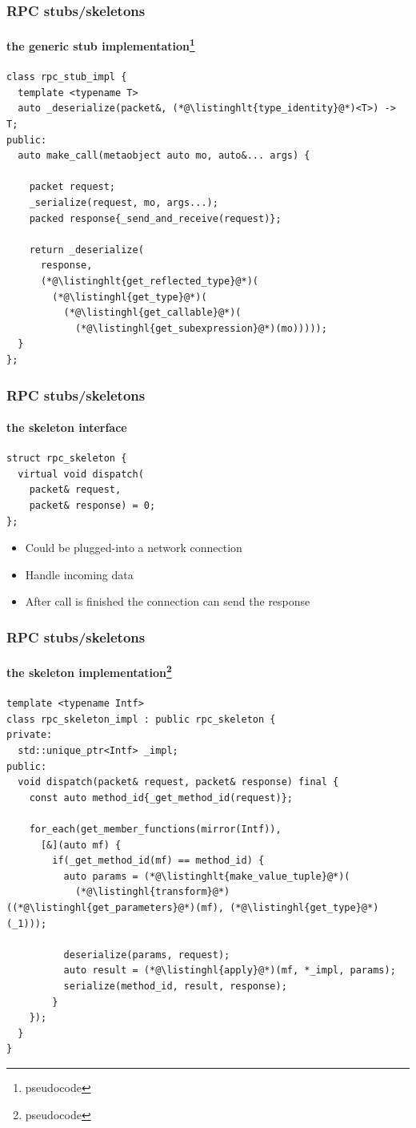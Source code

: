 \documentclass[compress,table,xcolor=table]{beamer}
\begin{document}
\begin{frame}[fragile]
  \frametitle{RPC stubs/skeletons}
  \framesubtitle{the generic stub implementation\footnote{pseudocode}}
  \begin{lstlisting}[language=c++2x,basicstyle=\footnotesize\ttfamily]
class rpc_stub_impl {
  template <typename T>
  auto _deserialize(packet&, (*@\listinghlt{type_identity}@*)<T>) -> T;
public:
  auto make_call(metaobject auto mo, auto&... args) {

    packet request;
    _serialize(request, mo, args...);
    packed response{_send_and_receive(request)};

    return _deserialize(
      response,
      (*@\listinghlt{get_reflected_type}@*)(
        (*@\listinghl{get_type}@*)(
          (*@\listinghl{get_callable}@*)(
            (*@\listinghl{get_subexpression}@*)(mo)))));
  }
};
  \end{lstlisting}
\end{frame}
\begin{frame}[fragile]
  \frametitle{RPC stubs/skeletons}
  \framesubtitle{the skeleton interface}
  \begin{lstlisting}[language=c++2x]
struct rpc_skeleton {
  virtual void dispatch(
    packet& request,
    packet& response) = 0;
};
  \end{lstlisting}
  \begin{itemize}
    \item Could be plugged-into a network connection
    \item Handle incoming data
    \item After call is finished the connection can send the response
  \end{itemize}
\end{frame}
\begin{frame}[fragile]
  \frametitle{RPC stubs/skeletons}
  \framesubtitle{the skeleton implementation\footnote{pseudocode}}
  \begin{lstlisting}[language=c++2x,basicstyle=\scriptsize\ttfamily]
template <typename Intf>
class rpc_skeleton_impl : public rpc_skeleton {
private:
  std::unique_ptr<Intf> _impl;
public:
  void dispatch(packet& request, packet& response) final {
    const auto method_id{_get_method_id(request)};

    for_each(get_member_functions(mirror(Intf)),
      [&](auto mf) {
        if(_get_method_id(mf) == method_id) {
          auto params = (*@\listinghlt{make_value_tuple}@*)(
            (*@\listinghl{transform}@*)((*@\listinghl{get_parameters}@*)(mf), (*@\listinghl{get_type}@*)(_1)));

          deserialize(params, request);
          auto result = (*@\listinghl{apply}@*)(mf, *_impl, params);
          serialize(method_id, result, response);
        }
    });
  }
}
  \end{lstlisting}
\end{frame}
\end{document}
